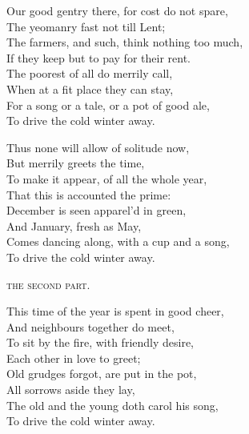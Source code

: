 \begin{dcverse}
\begin{altverse}
Our good gentry there, for cost do not spare,\\
The yeomanry fast not till Lent;\\
The farmers, and such, think nothing too much,\\
If they keep but to pay for their rent.\\
The poorest of all do merrily call,\\
When at a fit place they can stay,\\
For a song or a tale, or a pot of good ale,\\
To drive the cold winter away.
\end{altverse}

\begin{altverse}
Thus none will allow of solitude now,\\
But merrily greets the time,\\
To make it appear, of all the whole year,\\
That this is accounted the prime:\\
December is seen apparel’d in green,\\
And January, fresh as May,\\
Comes dancing along, with a cup and a song,\\
To drive the cold winter away.
\end{altverse}

\begin{altverse}
\vin\vin\vin\textsc{the second part.}
\end{altverse}

\begin{altverse}
This time of the year is spent in good cheer,\\
And neighbours together do meet,\\
To sit by the fire, with friendly desire,\\
Each other in love to greet;\\
Old grudges forgot, are put in the pot,\\
All sorrows aside they lay,\\
The old and the young doth carol his song,\\
To drive the cold winter away.
\end{altverse}


\end{dcverse}
